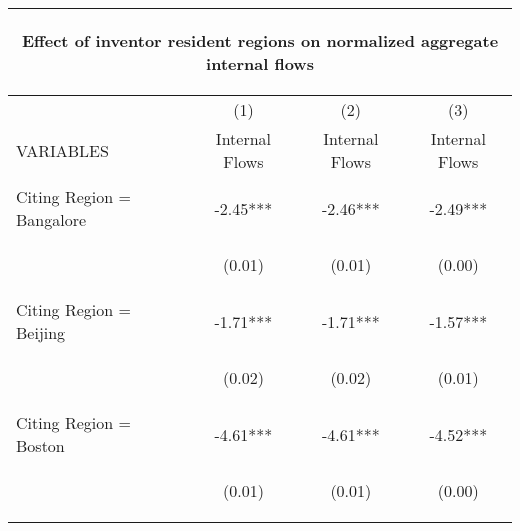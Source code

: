 \begin{center}
\begin{tabular}{lccc}
\multicolumn{4}{c}{\begin{large}Effect of inventor resident regions on normalized aggregate internal flows \label{internal}\end{large}} \\ \hline
 & (1) & (2) & (3) \\
VARIABLES & Internal Flows & Internal Flows & Internal Flows \\ \hline
\vspace{4pt} & \begin{footnotesize}\end{footnotesize} & \begin{footnotesize}\end{footnotesize} & \begin{footnotesize}\end{footnotesize} \\
Citing Region = Bangalore & -2.45*** & -2.46*** & -2.49*** \\
\vspace{4pt} & \begin{footnotesize}(0.01)\end{footnotesize} & \begin{footnotesize}(0.01)\end{footnotesize} & \begin{footnotesize}(0.00)\end{footnotesize} \\
Citing Region = Beijing & -1.71*** & -1.71*** & -1.57*** \\
\vspace{4pt} & \begin{footnotesize}(0.02)\end{footnotesize} & \begin{footnotesize}(0.02)\end{footnotesize} & \begin{footnotesize}(0.01)\end{footnotesize} \\
Citing Region = Boston & -4.61*** & -4.61*** & -4.52*** \\
\vspace{4pt} & \begin{footnotesize}(0.01)\end{footnotesize} & \begin{footnotesize}(0.01)\end{footnotesize} & \begin{footnotesize}(0.00)\end{footnotesize} \\

\end{tabular}
\end{center}

